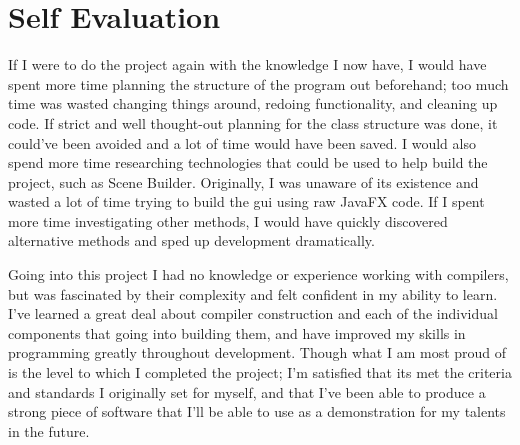 \documentclass[
]{report}
\begin{document}
\section{Self Evaluation}
If I were to do the project again with the knowledge I now have, I would
have spent more time planning the structure of the program out
beforehand; too much time was wasted changing things around, redoing
functionality, and cleaning up code. If strict and well thought-out
planning for the class structure was done, it could've been avoided and
a lot of time would have been saved. I would also spend more time
researching technologies that could be used to help build the project,
such as Scene Builder. Originally, I was unaware of its existence and
wasted a lot of time trying to build the \acrshort{gui} using raw JavaFX code. If I
spent more time investigating other methods, I would have quickly
discovered alternative methods and sped up development dramatically.

Going into this project I had no knowledge or experience working with
compilers, but was fascinated by their complexity and felt confident in
my ability to learn. I've learned a great deal about compiler
construction and each of the individual components that going into
building them, and have improved my skills in programming greatly
throughout development. Though what I am most proud of is the level to
which I completed the project; I'm satisfied that its met the criteria
and standards I originally set for myself, and that I've been able to
produce a strong piece of software that I'll be able to use as a
demonstration for my talents in the future.
\end{document}
